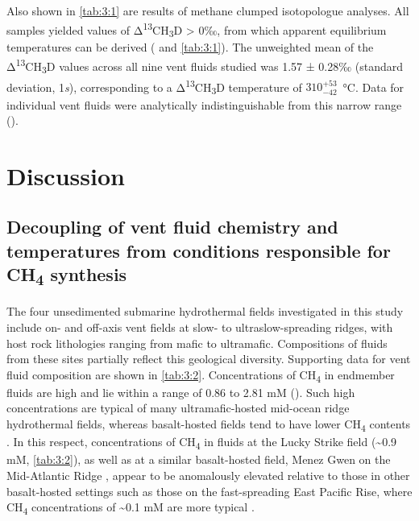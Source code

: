 


Also shown in \autoref{tab:3:1} are results of methane clumped isotopologue
analyses. All samples yielded values of
Δ\textsuperscript{13}CH\textsubscript{3}D \textgreater{} 0‰, from which
apparent equilibrium temperatures can be derived ( and \autoref{tab:3:1}).
The unweighted mean of the Δ\textsuperscript{13}CH\textsubscript{3}D
values across all nine vent fluids studied was 1.57 ± 0.28‰ (standard
deviation, 1\emph{s}), corresponding to a
Δ\textsuperscript{13}CH\textsubscript{3}D temperature of
\(310_{- 42}^{+ 53}\)~°C. Data for individual vent fluids were
analytically indistinguishable from this narrow range ().

\section{Discussion}\label{sec:3:discussion}

\subsection{\texorpdfstring{Decoupling of vent fluid chemistry and
		temperatures from conditions responsible for CH\textsubscript{4}
		synthesis}{Decoupling of vent fluid chemistry and temperatures from conditions responsible for CH4 synthesis}}\label{decoupling-of-vent-fluid-chemistry-and-temperatures-from-conditions-responsible-for-ch4-synthesis}

The four unsedimented submarine hydrothermal fields investigated in this
study include on- and off-axis vent fields at slow- to
ultraslow-spreading ridges, with host rock lithologies ranging from
mafic to ultramafic. Compositions of fluids from these sites partially
reflect this geological diversity. Supporting data for vent fluid
composition are shown in \autoref{tab:3:2}. Concentrations of CH\textsubscript{4}
in endmember fluids are high and lie within a range of 0.86 to 2.81 mM
(). Such high concentrations are typical of many
ultramafic-hosted mid-ocean ridge hydrothermal fields, whereas
basalt-hosted fields tend to have lower CH\textsubscript{4} contents \parencite[\textasciitilde{}0.1 mM;][]{McCollom+Seewald_2007_CR,Keir_2010_GRL}. In
this respect, concentrations of CH\textsubscript{4} in fluids at the
Lucky Strike field (\textasciitilde{}0.9 mM, \autoref{tab:3:2}), as well as at a
similar basalt-hosted field, Menez Gwen on the Mid-Atlantic Ridge \parencite[\textasciitilde{}1.7 mM,][]{Charlou++_2000_CG}, appear to be
anomalously elevated relative to those in other basalt-hosted settings
such as those on the fast-spreading East Pacific Rise, where
CH\textsubscript{4} concentrations of \textasciitilde{}0.1 mM are more
typical \parencite{McCollom+Seewald_2007_CR,Keir_2010_GRL}.

